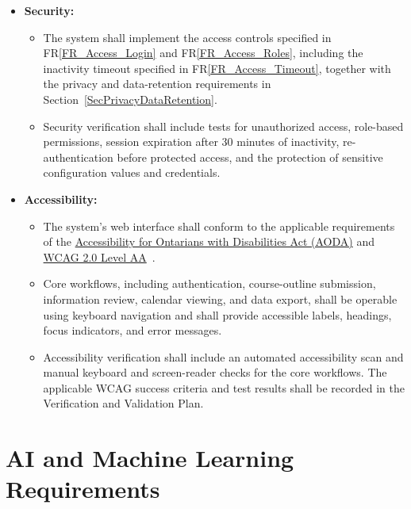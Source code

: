 \documentclass[12pt]{article}
\newcommand{\rref}[1]{FR\ref{#1}}
\newcounter{nfrnum} %
\begin{document}
\begin{itemize}
\item[NFR\refstepcounter{nfrnum}\thenfrnum \label{NFR_Security}:]
\textbf{Security:}
\begin{itemize}
    \item The system shall implement the access controls specified in \rref{FR_Access_Login}
    and \rref{FR_Access_Roles}, including the inactivity timeout specified in
    \rref{FR_Access_Timeout}, together with the privacy and data-retention requirements
    in Section~\ref{SecPrivacyDataRetention}.
    \item Security verification shall include tests for unauthorized access, role-based
    permissions, session expiration after 30 minutes of inactivity, re-authentication
    before protected access, and the protection of sensitive configuration values and
    credentials.
\end{itemize}

\item[NFR\refstepcounter{nfrnum}\thenfrnum \label{NFR_Accessibility}:]
\textbf{Accessibility:}
\begin{itemize}
    \item The system's web interface shall conform to the applicable requirements of the
    \href{https://www.ontario.ca/laws/regulation/110191}{Accessibility for Ontarians with
    Disabilities Act (AODA)} and
    \href{https://www.w3.org/TR/WCAG20/}{WCAG 2.0 Level AA}~\citep{AODA2005, IASR2011, WCAG20}.
    \item Core workflows, including authentication, course-outline submission, information
    review, calendar viewing, and data export, shall be operable using keyboard navigation
    and shall provide accessible labels, headings, focus indicators, and error messages.
    \item Accessibility verification shall include an automated accessibility scan and
    manual keyboard and screen-reader checks for the core workflows. The applicable WCAG
    success criteria and test results shall be recorded in the Verification and Validation
    Plan.
\end{itemize}

\end{itemize}



\section{AI and Machine Learning Requirements} \label{sec_AIReqs}
\end{document}

